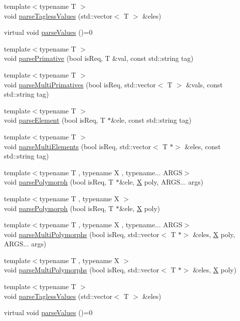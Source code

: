 \begin{DoxyCompactItemize}
\item 
{\footnotesize template$<$typename T $>$ }\\void \hyperlink{classParseInterface_a60c8afbe5369965c8855491bb3f75668}{parse\+Tagless\+Values} (std\+::vector$<$ T $>$ \&eles)
\item 
virtual void \hyperlink{classParseInterface_afca32108192ba0997c9e5a78189b0cbc}{parse\+Values} ()=0
\item 
{\footnotesize template$<$typename T $>$ }\\void \hyperlink{classParseInterface_a2ba3a44090e2bebeb485457ea4c743a8}{parse\+Primative} (bool is\+Req, T \&val, const std\+::string tag)
\item 
{\footnotesize template$<$typename T $>$ }\\void \hyperlink{classParseInterface_ab6ffc29634def5ea16a7a30998cc15f8}{parse\+Multi\+Primatives} (bool is\+Req, std\+::vector$<$ T $>$ \&vals, const std\+::string tag)
\item 
{\footnotesize template$<$typename T $>$ }\\void \hyperlink{classParseInterface_a289c74beb3acea103f9864f2225bce00}{parse\+Element} (bool is\+Req, T $\ast$\&ele, const std\+::string tag)
\item 
{\footnotesize template$<$typename T $>$ }\\void \hyperlink{classParseInterface_aca9ff3a3139e6939cb7b0c8612d4a609}{parse\+Multi\+Elements} (bool is\+Req, std\+::vector$<$ T $\ast$$>$ \&eles, const std\+::string tag)
\item 
{\footnotesize template$<$typename T , typename X , typename... A\+R\+GS$>$ }\\void \hyperlink{classParseInterface_af24b31d7ffc3029b8a7a67f986ab414f}{parse\+Polymorph} (bool is\+Req, T $\ast$\&ele, \hyperlink{classX}{X} poly, A\+R\+G\+S... args)
\item 
{\footnotesize template$<$typename T , typename X $>$ }\\void \hyperlink{classParseInterface_a3eddda17bca991a068b171fb6949bce8}{parse\+Polymorph} (bool is\+Req, T $\ast$\&ele, \hyperlink{classX}{X} poly)
\item 
{\footnotesize template$<$typename T , typename X , typename... A\+R\+GS$>$ }\\void \hyperlink{classParseInterface_ab742098ba7badf016388bd10b32fb1ee}{parse\+Multi\+Polymorphs} (bool is\+Req, std\+::vector$<$ T $\ast$$>$ \&eles, \hyperlink{classX}{X} poly, A\+R\+G\+S... args)
\item 
{\footnotesize template$<$typename T , typename X $>$ }\\void \hyperlink{classParseInterface_a3d1afd8bdd00110808e3c42320556544}{parse\+Multi\+Polymorphs} (bool is\+Req, std\+::vector$<$ T $\ast$$>$ \&eles, \hyperlink{classX}{X} poly)
\item 
{\footnotesize template$<$typename T $>$ }\\void \hyperlink{classParseInterface_a60c8afbe5369965c8855491bb3f75668}{parse\+Tagless\+Values} (std\+::vector$<$ T $>$ \&eles)
\item 
virtual void \hyperlink{classParseInterface_afca32108192ba0997c9e5a78189b0cbc}{parse\+Values} ()=0
\end{DoxyCompactItemize}
